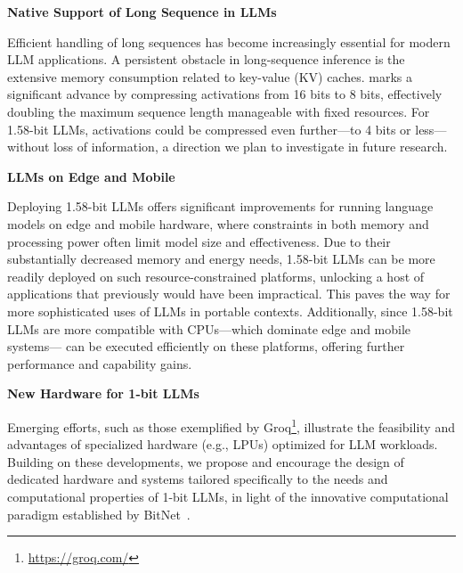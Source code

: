 \textbf{Native Support of Long Sequence in LLMs}

Efficient handling of long sequences has become increasingly essential for modern LLM applications. A persistent obstacle in long-sequence inference is the extensive memory consumption related to key-value (KV) caches.  marks a significant advance by compressing activations from 16 bits to 8 bits, effectively doubling the maximum sequence length manageable with fixed resources. For 1.58-bit LLMs, activations could be compressed even further—to 4 bits or less—without loss of information, a direction we plan to investigate in future research.

\textbf{LLMs on Edge and Mobile}

Deploying 1.58-bit LLMs offers significant improvements for running language models on edge and mobile hardware, where constraints in both memory and processing power often limit model size and effectiveness. Due to their substantially decreased memory and energy needs, 1.58-bit LLMs can be more readily deployed on such resource-constrained platforms, unlocking a host of applications that previously would have been impractical. This paves the way for more sophisticated uses of LLMs in portable contexts. Additionally, since 1.58-bit LLMs are more compatible with CPUs—which dominate edge and mobile systems— can be executed efficiently on these platforms, offering further performance and capability gains.

\textbf{New Hardware for 1-bit LLMs}

Emerging efforts, such as those exemplified by Groq\footnote{\url{https://groq.com/}}, illustrate the feasibility and advantages of specialized hardware (e.g., LPUs) optimized for LLM workloads. Building on these developments, we propose and encourage the design of dedicated hardware and systems tailored specifically to the needs and computational properties of 1-bit LLMs, in light of the innovative computational paradigm established by BitNet~\cite{bitnet}.